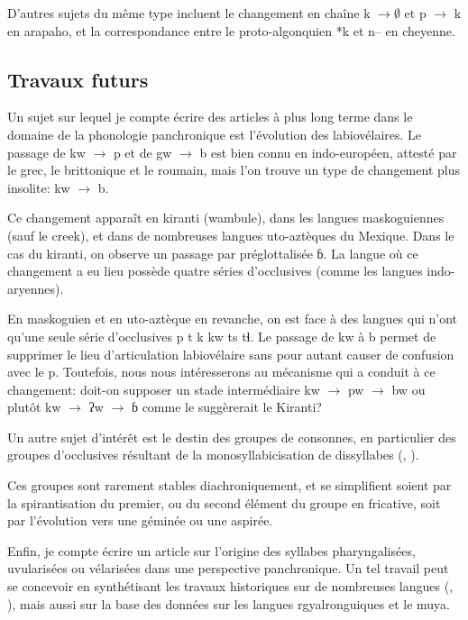 \documentclass[oldfontcommands,oneside,a4paper,11pt]{memoir}
\begin{document}
D'autres sujets du même type incluent le changement en chaîne k $\rightarrow \emptyset$ et p $\rightarrow $ k en arapaho, et la correspondance entre le proto-algonquien *k et n-- en cheyenne.

\subsection{Travaux futurs}
Un sujet sur lequel je compte écrire des articles à plus long terme dans le domaine de la phonologie panchronique est l'évolution des labiovélaires. Le passage de kw $\rightarrow $ p et de gw $\rightarrow $ b est bien connu en indo-européen, attesté par le grec, le brittonique et le roumain, mais l'on trouve un type de changement plus insolite: kw $\rightarrow $ b.

Ce changement apparaît en kiranti (wambule), dans les langues maskoguiennes (sauf le creek), et dans de nombreuses langues uto-aztèques du Mexique. Dans le cas du kiranti, on observe un passage par préglottalisée ɓ. La langue où ce changement a eu lieu possède quatre séries d'occlusives (comme les langues indo-aryennes).

En maskoguien et en uto-aztèque en revanche, on est face à des langues qui n'ont qu'une seule série d'occlusives p t k kw ts tɬ. Le passage de kw à b permet de supprimer le lieu d'articulation labiovélaire sans pour autant causer de confusion avec le p. Toutefois, nous nous intéresserons au mécanisme qui a conduit à ce changement: doit-on supposer un stade intermédiaire kw $\rightarrow $ pw $\rightarrow $ bw ou plutôt kw $\rightarrow $ ʔw $\rightarrow $ ɓ comme le suggèrerait le Kiranti?

Un autre sujet d'intérêt est le destin des groupes de consonnes, en particulier des groupes d'occlusives résultant de la monosyllabicisation de dissyllabes (\citealt{ferlus82spirantisation}, \citealt{michaud12mono}). 

 Ces groupes sont rarement stables diachroniquement, et se simplifient soient par la spirantisation du premier, ou du second élément du groupe en fricative, soit par l'évolution vers une géminée ou une aspirée.  

Enfin, je compte écrire un article sur l'origine des syllabes pharyngalisées, uvularisées ou vélarisées  dans une perspective panchronique. Un tel travail peut se concevoir en synthétisant les travaux historiques sur de nombreuses langues (\citealt{authier08budugh}, \citealt{sagart-baxter09}), mais aussi sur la base des données sur les langues rgyalronguiques et le muya.
\end{document}
